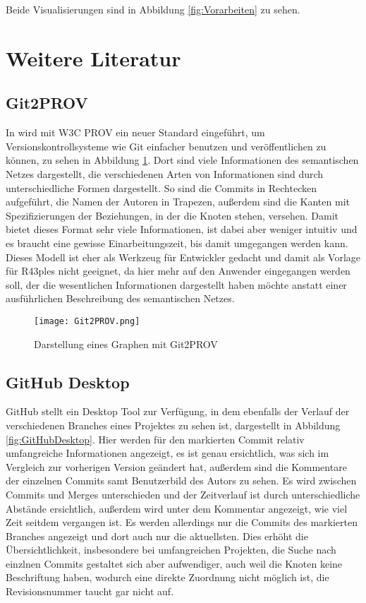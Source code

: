 \documentclass[color]{tudbook}
\begin{document}
Beide Visualisierungen sind in Abbildung \ref{fig:Vorarbeiten} zu sehen.

\section{Weitere Literatur}
\label{sec:WeitereLiteratur}
\subsection{Git2PROV}
\label{sec:Git2PROV}
In \cite{Git2PROV} wird mit W3C PROV ein neuer Standard eingeführt, um Versionskontrollsysteme wie Git einfacher benutzen und veröffentlichen zu können, zu sehen in Abbildung \ref{fig:Git2PROV}. Dort sind viele Informationen des semantischen Netzes dargestellt, die verschiedenen Arten von Informationen sind durch unterschiedliche Formen dargestellt. So sind die Commits in Rechtecken aufgeführt, die Namen der Autoren in Trapezen, außerdem sind die Kanten mit Spezifizierungen der Beziehungen, in der die Knoten stehen, versehen. Damit bietet dieses Format sehr viele Informationen, ist dabei aber weniger intuitiv und es braucht eine gewisse Einarbeitungszeit, bis damit umgegangen werden kann. Dieses Modell ist eher als Werkzeug für Entwickler gedacht und damit als Vorlage für R43ples nicht geeignet, da hier mehr auf den Anwender eingegangen werden soll, der die wesentlichen Informationen dargestellt haben möchte anstatt einer ausführlichen Beschreibung des semantischen Netzes.

\begin{figure}[htbp] 
  \centering
     \texttt{[image: Git2PROV.png]}
  \caption[Darstellung eines Graphen mit Git2PROV, entnommen aus \cite{Git2PROV}]{Darstellung eines Graphen mit Git2PROV}
  \label{fig:Git2PROV}
\end{figure}

\subsection{GitHub Desktop}
GitHub stellt ein Desktop Tool zur Verfügung, in dem ebenfalls der Verlauf der verschiedenen Branches eines Projektes zu sehen ist, dargestellt in Abbildung \ref{fig:GitHubDesktop}. Hier werden für den markierten Commit relativ umfangreiche Informationen angezeigt, es ist genau ersichtlich, was sich im Vergleich zur vorherigen Version geändert hat, außerdem sind die Kommentare der einzelnen Commits samt Benutzerbild des Autors zu sehen. Es wird zwischen Commits und Merges unterschieden und der Zeitverlauf ist durch unterschiedliche Abstände ersichtlich, außerdem wird unter dem Kommentar angezeigt, wie viel Zeit seitdem vergangen ist. Es werden allerdings nur die Commits des markierten Branches angezeigt und dort auch nur die aktuellsten. Dies erhöht die Übersichtlichkeit, insbesondere bei umfangreichen Projekten, die Suche nach einzlnen Commits gestaltet sich aber aufwendiger, auch weil die Knoten keine Beschriftung haben, wodurch eine direkte Zuordnung nicht möglich ist, die Revisionsnummer taucht gar nicht auf.
\end{document}
